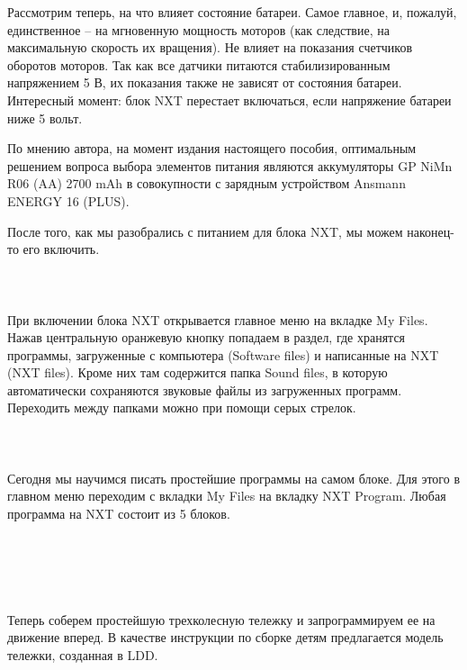 Рассмотрим теперь, на что влияет состояние батареи. Самое главное, и, пожалуй, единственное – на мгновенную мощность моторов (как следствие, на максимальную скорость их вращения). Не влияет на показания счетчиков оборотов моторов. Так как все датчики питаются стабилизированным напряжением 5 В, их показания также не зависят от состояния батареи.
Интересный момент: блок NXT перестает включаться, если напряжение батареи ниже 5 вольт.

По мнению автора, на момент издания настоящего пособия, оптимальным решением вопроса выбора элементов питания являются аккумуляторы GP NiMn R06 (AA) 2700 mAh в совокупности с зарядным устройством Ansmann ENERGY 16 (PLUS).

После того, как мы разобрались с питанием для блока NXT, мы можем наконец-то его включить.\\\\

{\hypertarget{lesson4x3}{}}\\\\	

При включении блока NXT открывается главное меню на вкладке My Files. Нажав центральную оранжевую кнопку попадаем в раздел, где хранятся программы, загруженные с компьютера (Software files)  и написанные на NXT (NXT files). Кроме них там содержится папка Sound files, в которую автоматически сохраняются звуковые файлы из загруженных программ. Переходить между папками можно при помощи серых стрелок.\\\\
\\\\

Сегодня мы научимся писать простейшие программы на самом блоке. Для этого в главном меню переходим с вкладки My Files на вкладку NXT Program. Любая программа на NXT состоит из 5 блоков.\\\\
\\\\

{\hypertarget{lesson4x4}{}}\\\\	

Теперь соберем простейшую трехколесную тележку и запрограммируем ее на движение вперед. В качестве инструкции по сборке детям предлагается модель тележки, созданная в LDD. 

